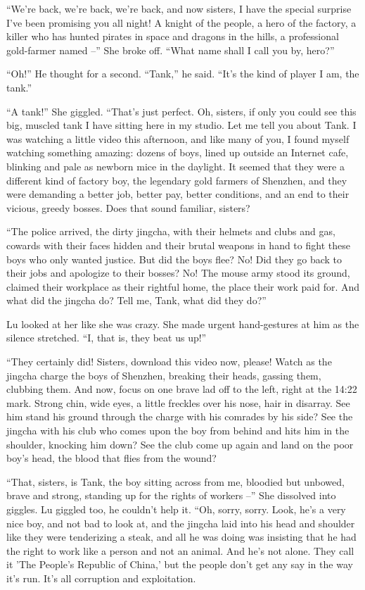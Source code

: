 ``We're back, we're back, we're back, and now sisters, I have the
special surprise I've been promising you all night! A knight of the
people, a hero of the factory, a killer who has hunted pirates in
space and dragons in the hills, a professional gold-farmer named
--'' She broke off. ``What name shall I call you by, hero?''

``Oh!'' He thought for a second. ``Tank,'' he said. ``It's the kind of
player I am, the tank.''

``A tank!'' She giggled. ``That's just perfect. Oh, sisters, if only
you could see this big, muscled tank I have sitting here in my
studio. Let me tell you about Tank. I was watching a little video
this afternoon, and like many of you, I found myself watching
something amazing: dozens of boys, lined up outside an Internet
cafe, blinking and pale as newborn mice in the daylight. It seemed
that they were a different kind of factory boy, the legendary gold
farmers of Shenzhen, and they were demanding a better job, better
pay, better conditions, and an end to their vicious, greedy bosses.
Does that sound familiar, sisters?

``The police arrived, the dirty jingcha, with their helmets and
clubs and gas, cowards with their faces hidden and their brutal
weapons in hand to fight these boys who only wanted justice. But
did the boys flee? No! Did they go back to their jobs and apologize
to their bosses? No! The mouse army stood its ground, claimed their
workplace as their rightful home, the place their work paid for.
And what did the jingcha do? Tell me, Tank, what did they do?''

Lu looked at her like she was crazy. She made urgent hand-gestures
at him as the silence stretched. ``I, that is, they beat us up!''

``They certainly did! Sisters, download this video now, please!
Watch as the jingcha charge the boys of Shenzhen, breaking their
heads, gassing them, clubbing them. And now, focus on one brave lad
off to the left, right at the 14:22 mark. Strong chin, wide eyes, a
little freckles over his nose, hair in disarray. See him stand his
ground through the charge with his comrades by his side? See the
jingcha with his club who comes upon the boy from behind and hits
him in the shoulder, knocking him down? See the club come up again
and land on the poor boy's head, the blood that flies from the
wound?

``That, sisters, is Tank, the boy sitting across from me, bloodied
but unbowed, brave and strong, standing up for the rights of
workers --'' She dissolved into giggles. Lu giggled too, he couldn't
help it. ``Oh, sorry, sorry. Look, he's a very nice boy, and not bad
to look at, and the jingcha laid into his head and shoulder like
they were tenderizing a steak, and all he was doing was insisting
that he had the right to work like a person and not an animal. And
he's not alone. They call it 'The People's Republic of China,' but
the people don't get any say in the way it's run. It's all
corruption and exploitation.

